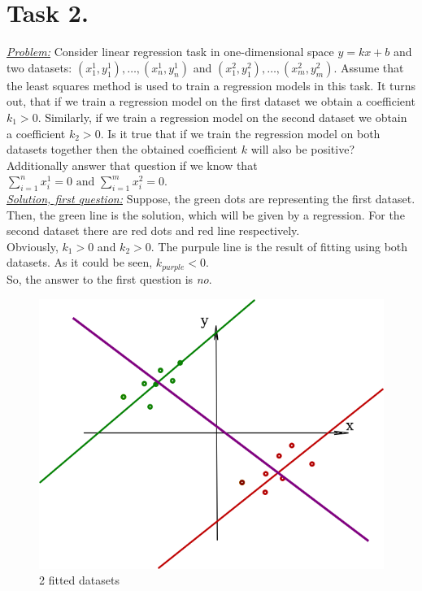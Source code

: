 \documentclass[a4paper,12pt]{article}
\begin{document}
\newpage
\section*{Task 2.}
\underline{\textit{Problem:}} Consider linear regression task in one-dimensional space \(y = kx+b\) and two
datasets: \((x_1^1 , y_1^1 ), \dots, (x^1_n , y_n^1 )\) and
\((x_1^2 , y_1^2), \dots, (x^2_m , y_m^2 )\).
Assume that the least squares method is used to train a regression models in this task.
It turns out, that if we train a regression model on the first dataset we obtain a coefficient \(k_1 > 0\).
Similarly, if we train a regression model on the second dataset we obtain a
coefficient \(k_2 > 0\). Is it true that if we train the regression model on
both datasets together then the obtained coefficient \(k\) will also
be positive?
Additionally answer that question if we know that \(\sum_{i=1}^nx_i^1 = 0 \text{ and  } \sum_{i=1}^mx_i^2 = 0\).\\
\newline
\underline{\textit{Solution, first question:}} Suppose, the green dots are
representing the first dataset. Then, the green line is the solution, which
will be given by a regression. For the second dataset there are red dots and
red line respectively.\\
\newline
Obviously, \(k_1 > 0\) and \(k_2 > 0\). The purpule line is the result of fitting using both datasets. As it could be seen, \(k_{purple} < 0\).\\
\newline
So, the answer to the first question is \textit{no}.

\begin{figure}[h]
    \centering
    \includegraphics[width=.85\textwidth]{fit-dataset}
    \caption{2 fitted datasets}
\end{figure}
\end{document}
